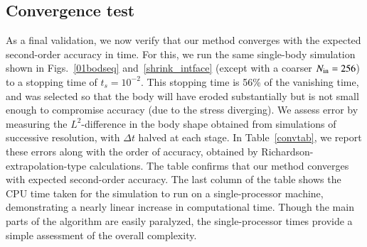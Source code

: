 \documentclass[preprint, 10pt]{elsarticle}
\begin{document}
\subsection{Convergence test}
As a final validation, we now verify that our method converges with the expected second-order accuracy in time. For this, we run the same single-body simulation shown in Figs.~\ref{01bodseq} and~\ref{shrink_intface} (except with a coarser $N_{\mathrm{in}}=256$) to a stopping time of $t_s = 10^{-2}$. This stopping time is 56\% of the vanishing time, and was selected so that the body will have eroded substantially but is not small enough to compromise accuracy (due to the stress diverging).  We assess error by measuring the $L^2$-difference in the body shape obtained from simulations of successive resolution, with $\Delta t$ halved at each stage. In Table~\ref{convtab}, we report these errors along with the order of accuracy, obtained by Richardson-extrapolation-type calculations. The table confirms that our method converges with expected second-order accuracy. The last column of the table shows the CPU time taken for the simulation to run on a single-processor machine, demonstrating a nearly linear increase in computational time. Though the main parts of the algorithm are easily paralyzed, the single-processor times provide a simple assessment of the overall complexity.
\end{document}

